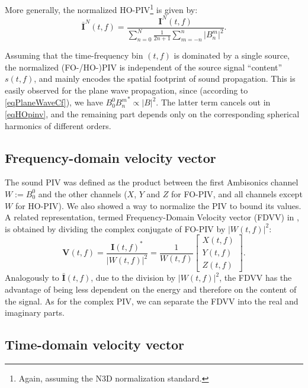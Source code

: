 More generally, the normalized HO-PIV\footnote{Again, assuming the N3D normalization standard.} is given by:
\begin{equation}\label{eqHOpinv}
     \bar{\mathbf{I}}^N(t,f) = \frac{\mathbf{I}^N(t,f)}{\sum_{n=0}^N \frac{1}{2n+1} \sum_{m=-n}^n \lvert B_n^m \rvert ^2}.
\end{equation}

Assuming that the time-frequency bin $(t,f)$ is dominated by a single source, the normalized (FO-/HO-)PIV is independent of the source signal ``content'' $s(t,f)$, and mainly encodes the spatial footprint of sound propagation. This is easily observed for the plane wave propagation, since (according to \eqref{eqPlaneWaveCf}), we have $B_0^0 {B_n^m}^* \propto |B|^2$. The latter term cancels out in \eqref{eqHOpinv}, and the remaining part depends only on the corresponding spherical harmonics of different orders.

\subsection{Frequency-domain velocity vector}

The sound PIV was defined as the product between the first Ambisonics channel $W:=B_0^0$ and the other channels ($X$, $Y$ and $Z$ for FO-PIV, and all channels except $W$ for HO-PIV). We also showed a way to normalize the PIV to bound its values. A related representation, termed Frequency-Domain Velocity vector (FDVV) in  \cite{daniel_representation_2001}, is obtained by dividing the complex conjugate of FO-PIV by $\lvert W(t,f) \rvert ^2$:
\begin{equation}\label{eqFDVV}
    \mathbf{V}(t,f) = \frac{\mathbf{I}(t,f)^*}{\lvert W(t,f) \rvert ^2} = 
    \frac{1}{W(t,f)}
    \begin{bmatrix} X(t,f) \\ Y(t,f) \\ Z(t,f) \end{bmatrix}.
\end{equation}
Analogously to $\bar{\mathbf{I}}(t,f)$, due to the division by $\lvert W(t,f) \rvert ^2$, the FDVV has the advantage of being less dependent on the energy and therefore on the content of the signal. As for the complex PIV, we can separate the FDVV into the real and imaginary parts. 

\subsection{Time-domain velocity vector}
\label{ss:tdvv}

